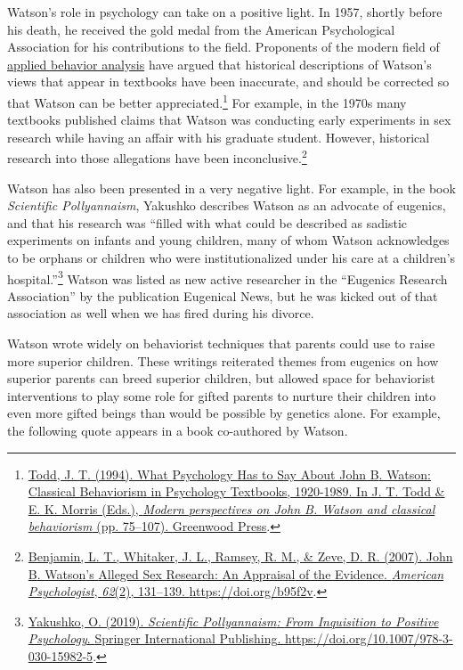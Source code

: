 \documentclass[
  oneside,
  12pt]{crumpbook}
\begin{document}
Watson's role in psychology can take on a positive light. In 1957, shortly before his death, he received the gold medal from the American Psychological Association for his contributions to the field. Proponents of the modern field of \href{https://en.wikipedia.org/wiki/Applied_behavior_analysis}{applied behavior analysis} have argued that historical descriptions of Watson's views that appear in textbooks have been inaccurate, and should be corrected so that Watson can be better appreciated.\footnote{\protect\hyperlink{ref-toddWhatPsychologyHas1994}{Todd, J. T. (1994). What {Psychology Has} to {Say About John B}. {Watson}: {Classical Behaviorism} in {Psychology Textbooks}, 1920-1989. In J. T. Todd \& E. K. Morris (Eds.), \emph{Modern perspectives on {John B}. {Watson} and classical behaviorism} (pp. 75--107). {Greenwood Press}}.} For example, in the 1970s many textbooks published claims that Watson was conducting early experiments in sex research while having an affair with his graduate student. However, historical research into those allegations have been inconclusive.\footnote{\protect\hyperlink{ref-benjaminJohnWatsonAlleged2007}{Benjamin, L. T., Whitaker, J. L., Ramsey, R. M., \& Zeve, D. R. (2007). John {B}. {Watson}'s {Alleged Sex Research}: {An Appraisal} of the {Evidence}. \emph{American Psychologist}, \emph{62}(2), 131--139. \url{https://doi.org/b95f2v}}.}

Watson has also been presented in a very negative light. For example, in the book \emph{Scientific Pollyannaism}, Yakushko describes Watson as an advocate of eugenics, and that his research was ``filled with what could be described as sadistic experiments on infants and young children, many of whom Watson acknowledges to be orphans or children who were institutionalized under his care at a children's hospital.''\footnote{\protect\hyperlink{ref-yakushkoScientificPollyannaismInquisition2019}{Yakushko, O. (2019). \emph{Scientific {Pollyannaism}: {From Inquisition} to {Positive Psychology}}. {Springer International Publishing}. \url{https://doi.org/10.1007/978-3-030-15982-5}}.} Watson was listed as new active researcher in the ``Eugenics Research Association'' by the publication Eugenical News, but he was kicked out of that association as well when we has fired during his divorce.

Watson wrote widely on behaviorist techniques that parents could use to raise more superior children. These writings reiterated themes from eugenics on how superior parents can breed superior children, but allowed space for behaviorist interventions to play some role for gifted parents to nurture their children into even more gifted beings than would be possible by genetics alone. For example, the following quote appears in a book co-authored by Watson.
\end{document}

